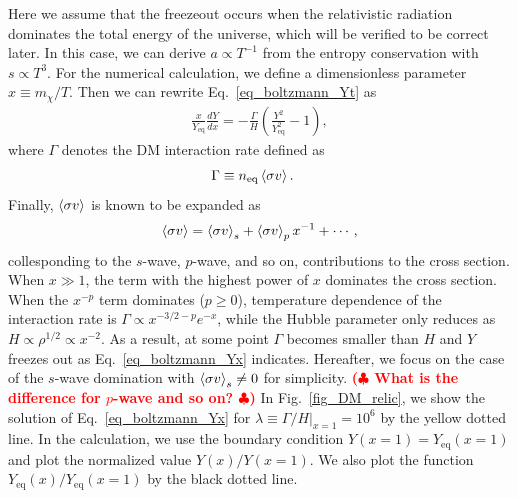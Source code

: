 \documentclass[12pt,twoside,book]{article}
\def\rem#1{ {\bf\textcolor{red}{($\clubsuit$ #1 $\clubsuit$)}}}
\begin{document}
Here we assume that the freezeout occurs when the relativistic radiation
dominates the total energy of the universe, which will be verified to be
correct later.  In this case, we can derive $a \propto T^{-1}$ from the
entropy conservation with $s \propto T^3$.  For the numerical
calculation, we define a dimensionless parameter $x \equiv m_\chi / T$.
Then we can rewrite Eq.~\eqref{eq_boltzmann_Yt} as
\begin{align}
 \frac{x}{Y_{\mathrm{eq}}} \frac{d Y}{d x} =
 -\frac{\Gamma}{H} \left( \frac{Y^2}{Y_{\mathrm{eq}}^2} - 1 \right),\label{eq_boltzmann_Yx}
\end{align}
where $\Gamma$ denotes the DM interaction rate defined as
\begin{align}
 \Gamma &\equiv n_{\mathrm{eq}} \Braket{\sigma v}.\label{eq_lambda}
\end{align}
Finally, $\Braket{\sigma v}$ is known to be expanded
as~\cite{Gondolo:1990dk}
\begin{align}
 \Braket{\sigma v} = \Braket{\sigma v}_s +
 \Braket{\sigma v}_p x^{-1} + \cdots,
\end{align}
collesponding to the $s$-wave, $p$-wave, and so on, contributions to
the cross section.  When $x \gg 1$, the term with the highest power of
$x$ dominates the cross section.  When the $x^{-p}$ term dominates ($p
\geq 0$), temperature dependence of the interaction rate is $\Gamma
\propto x^{-3/2-p} e^{-x}$, while the Hubble parameter only reduces as
$H \propto \rho^{1/2} \propto x^{-2}$.  As a result, at some point
$\Gamma$ becomes smaller than $H$ and $Y$ freezes out as
Eq.~\eqref{eq_boltzmann_Yx} indicates.  Hereafter, we focus on the
case of the $s$-wave domination with $\Braket{\sigma v}_s \neq 0$ for
simplicity.  \rem{What is the difference for $p$-wave and so on?}  In
Fig.~\ref{fig_DM_relic}, we show the solution of
Eq.~\eqref{eq_boltzmann_Yx} for $\lambda \equiv \left. \Gamma / H
\right|_{x=1} = 10^6$ by the yellow dotted line.  In the calculation,
we use the boundary condition $Y(x=1) = Y_{\mathrm{eq}} (x=1)$ and
plot the normalized value $Y(x) / Y(x=1)$.  We also plot the function
$Y_{\mathrm{eq}} (x) / Y_{\mathrm{eq}} (x=1)$ by the black dotted line.
\end{document}
